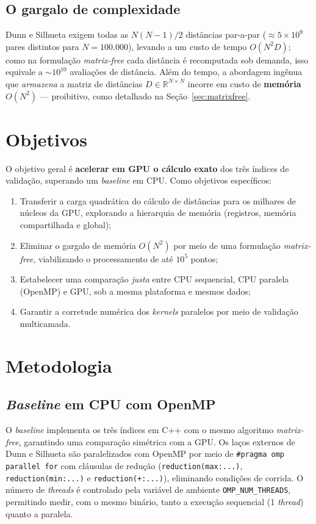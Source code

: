 \documentclass[12pt]{article}
\begin{document}
\subsection{O gargalo de complexidade}
Dunn e Silhueta exigem todas as $N(N-1)/2$ distâncias par-a-par
($\approx 5\times10^{9}$ pares distintos para $N=100.000$), levando a um
custo de tempo $O(N^2 D)$; como na formulação \emph{matrix-free} cada
distância é recomputada sob demanda, isso equivale a $\sim\!10^{10}$
avaliações de distância. Além do tempo, a abordagem ingênua que
\emph{armazena} a matriz de distâncias $D \in \mathbb{R}^{N\times N}$
incorre em custo de \textbf{memória} $O(N^2)$ --- proibitivo, como
detalhado na Seção~\ref{sec:matrixfree}.

\section{Objetivos}

O objetivo geral é \textbf{acelerar em GPU o cálculo exato} dos três índices
de validação, superando um \emph{baseline} em CPU. Como objetivos
específicos:
\begin{enumerate}
  \item Transferir a carga quadrática do cálculo de distâncias para os
  milhares de núcleos da GPU, explorando a hierarquia de memória (registros,
  memória compartilhada e global);
  \item Eliminar o gargalo de memória $O(N^2)$ por meio de uma formulação
  \emph{matrix-free}, viabilizando o processamento de até $10^5$ pontos;
  \item Estabelecer uma comparação \emph{justa} entre CPU sequencial, CPU
  paralela (OpenMP) e GPU, sob a mesma plataforma e mesmos dados;
  \item Garantir a corretude numérica dos \emph{kernels} paralelos por meio
  de validação multicamada.
\end{enumerate}

\section{Metodologia}

\subsection{\emph{Baseline} em CPU com OpenMP}
O \emph{baseline} implementa os três índices em C++ com o mesmo algoritmo
\emph{matrix-free}, garantindo uma comparação simétrica com a GPU. Os laços
externos de Dunn e Silhueta são paralelizados com OpenMP por meio de
\texttt{\#pragma omp parallel for} com cláusulas de redução
(\texttt{reduction(max:...)}, \texttt{reduction(min:...)} e
\texttt{reduction(+:...)}), eliminando condições de corrida. O número de
\emph{threads} é controlado pela variável de ambiente
\texttt{OMP\_NUM\_THREADS}, permitindo medir, com o mesmo binário, tanto a
execução sequencial (1 \emph{thread}) quanto a paralela.
\end{document}
